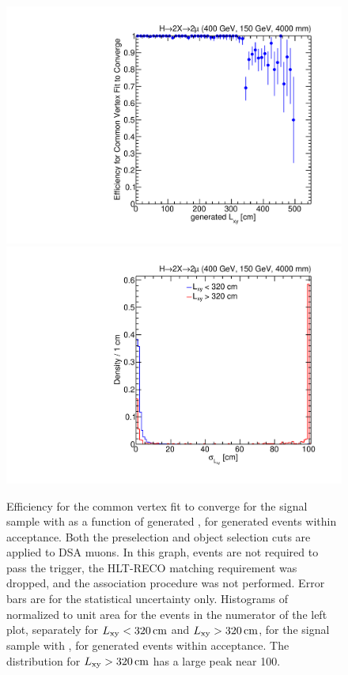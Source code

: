 \begin{figure}[htpb]
  \centering
  \includegraphics[width=\DSquareWidth]{figures/displaced/VFE_Lxy_2Mu2J_400_150_4000.pdf}
  \hspace*{-2em}
  \includegraphics[width=\DSquareWidth]{figures/displaced/LESSMORE_LxyErr_2Mu2J_400_150_4000.pdf}
  \caption[Efficiency for the common vertex fit to converge as a function of generated \Lxy for generated events within acceptance and histograms of \LxyErr normalized to unit area for $\Lxy < 320\cm$ and $\Lxy > 320\cm$.]{ Efficiency for the common vertex fit to converge for the \twoMu signal sample with  as a function of generated \Lxy, for generated events within acceptance. Both the preselection and object selection cuts are applied to DSA muons. In this graph, events are not required to pass the trigger, the HLT-RECO matching requirement was dropped, and the \DSAToPAT association procedure was not performed. Error bars are for the statistical uncertainty only.  Histograms of \LxyErr normalized to unit area for the events in the numerator of the left plot, separately for $\Lxy < 320\cm$ and $\Lxy > 320\cm$, for the \twoMu signal sample with , for generated events within acceptance. The distribution for $\Lxy > 320\cm$ has a large peak near 100\cm.}
  \label{fig:dd:VertexFitAnomalies}
\end{figure}

